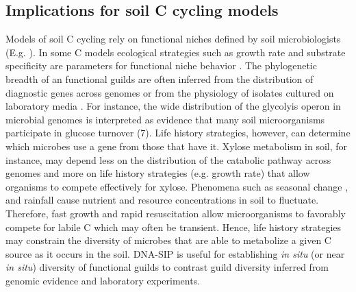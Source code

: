 \subsection{Implications for soil C cycling models}
Models of soil C cycling rely on functional niches defined by soil
microbiologists (E.g. \citep{wieder_2014a,Kaiser2014a}). In some C models
ecological strategies such as growth rate and substrate specificity are
parameters for functional niche behavior \citep{Kaiser2014a}. The phylogenetic
breadth of an functional guilds are often inferred from the distribution of
diagnostic genes across genomes \citep{Berlemont2013} or from the physiology of
isolates cultured on laboratory media \citep{Martiny2013}. For instance, the
wide distribution of the glycolyis operon in microbial genomes is interpreted
as evidence that many soil microorganisms participate in glucose turnover (7).
Life history strategies, however, can determine which microbes use a gene from
those that have it. Xylose metabolism in soil, for instance, may depend less on
the distribution of the catabolic pathway across genomes and more on life
history strategies (e.g. growth rate) that allow organisms to compete
effectively for xylose. Phenomena such as seasonal change
\citep{Schmidt2007}, and rainfall \citep{Evans2014a} cause nutrient and
resource concentrations in soil to fluctuate. Therefore, fast growth and rapid
resuscitation allow microorganisms to favorably compete for labile C which may
often be transient. Hence, life history strategies may constrain the diversity
of microbes that are able to metabolize a given C source as it occurs in the
soil. DNA-SIP is useful for establishing \textit{in situ} (or near \textit{in
situ}) diversity of functional guilds to contrast guild diversity inferred from
genomic evidence and laboratory experiments. 


